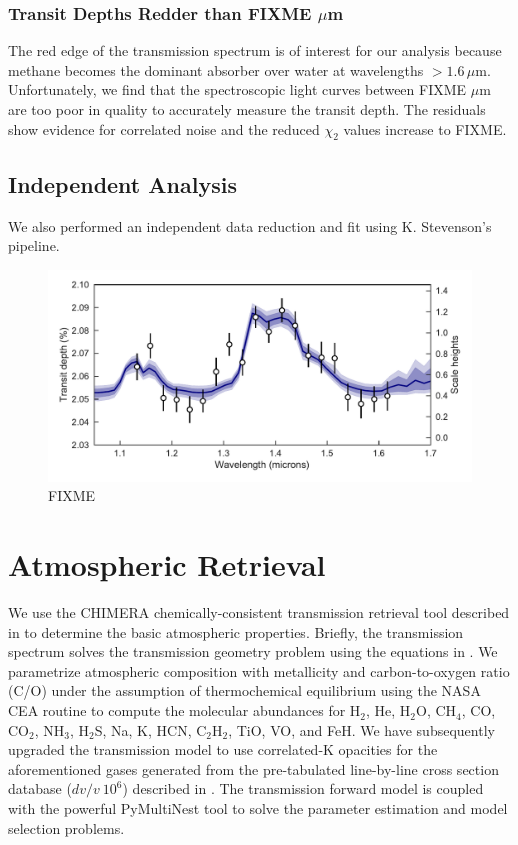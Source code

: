 \documentclass[twocolumn]{aastex61}
\begin{document}
\subsubsection{Transit Depths Redder than FIXME $\mu$m}
The red edge of the transmission spectrum is of interest for our analysis because methane becomes the dominant absorber over water at wavelengths $> 1.6\,\mu$m. Unfortunately, we find that the spectroscopic light curves between FIXME $\mu$m are too poor in quality to accurately measure the transit depth. The residuals show evidence for correlated noise and the reduced $\chi_2$ values increase to FIXME. 

\subsection{Independent Analysis}
We also performed an independent data reduction and fit using K. Stevenson's pipeline.

\begin{figure}
\includegraphics[width = \textwidth]{Figures/spectrum.pdf}
\caption{FIXME}
\label{fig:spectrum}
\end{figure}

\section{Atmospheric Retrieval}
We use the CHIMERA chemically-consistent transmission retrieval tool described in \cite{kreidberg15b} to determine the basic atmospheric properties.   Briefly, the transmission spectrum solves the transmission geometry problem using the equations in \cite{brown01, tinetti12}.  We parametrize atmospheric composition with metallicity and carbon-to-oxygen ratio (C/O) under the assumption of thermochemical equilibrium using the NASA CEA routine \citep{gordon96} to compute the molecular abundances for H$_2$, He, H$_2$O, CH$_4$, CO, CO$_2$, NH$_3$, H$_2$S, Na, K, HCN, C$_2$H$_2$, TiO, VO, and FeH.    We have subsequently upgraded the transmission model to use correlated-K opacities \citep{lacis91, molliere15, amundsen16} for the aforementioned gases generated from the pre-tabulated line-by-line cross section database ($dv/v~10^6$) described in \cite{freedman14}. The transmission forward model is coupled with the powerful PyMultiNest tool \citep{buchner16} to solve the parameter estimation and model selection problems.  
\end{document}
